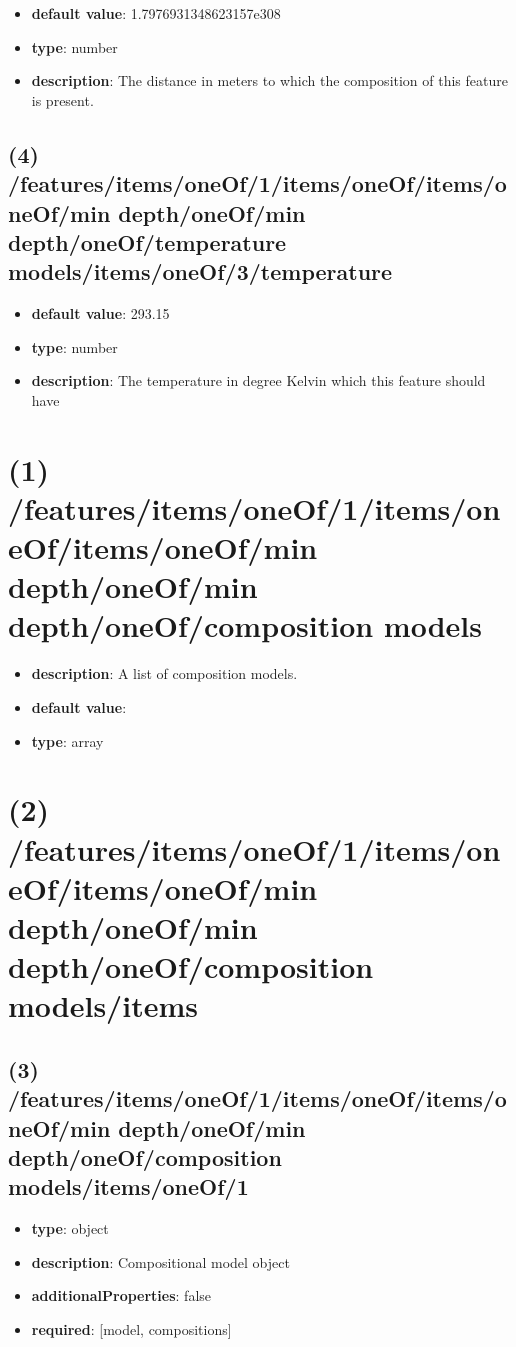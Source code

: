 \begin{itemize}[leftmargin=4em]\item {\bf default value}: 1.7976931348623157e308
\item {\bf type}: number
\item {\bf description}: The distance in meters to which the composition of this feature is present.
\end{itemize}\subsection{(4) /features/items/oneOf/1/items/oneOf/items/oneOf/min depth/oneOf/min depth/oneOf/temperature models/items/oneOf/3/temperature}
\begin{itemize}[leftmargin=4em]\item {\bf default value}: 293.15
\item {\bf type}: number
\item {\bf description}: The temperature in degree Kelvin which this feature should have
\end{itemize}\section{(1) /features/items/oneOf/1/items/oneOf/items/oneOf/min depth/oneOf/min depth/oneOf/composition models}
\begin{itemize}[leftmargin=1em]\item {\bf description}: A list of composition models.
\item {\bf default value}: 
\item {\bf type}: array
\end{itemize}\section{(2) /features/items/oneOf/1/items/oneOf/items/oneOf/min depth/oneOf/min depth/oneOf/composition models/items}

\subsection{(3) /features/items/oneOf/1/items/oneOf/items/oneOf/min depth/oneOf/min depth/oneOf/composition models/items/oneOf/1}
\begin{itemize}[leftmargin=3em]\item {\bf type}: object
\item {\bf description}: Compositional model object
\item {\bf additionalProperties}: false
\item {\bf required}: [model, compositions]\end{itemize}
